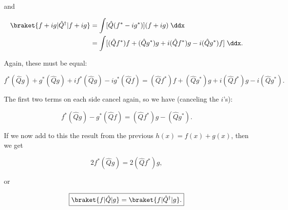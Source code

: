 and

\begin{align*}
    \braket{f+ig|\hat{Q}^{\dagger}|f+ig} &= \int[\hat{Q}(f^* - ig^*)](f + ig)\;\ddx \\
    &= \int[(\hat{Q}f^*)f + (\hat{Q}g^*)g + i(\hat{Q}f^*)g - i(\hat{Q}g^*)f]\;\ddx.
\end{align*}

Again, these must be equal:

\begin{equation*}
    f^*(\hat{Q}g) + g^*(\hat{Q}g) + if^*(\hat{Q}g) - ig^*(\hat{Q}f) = (\hat{Q}f^*)f + (\hat{Q}g^*)g + i(\hat{Q}f^*)g - i(\hat{Q}g^*).
\end{equation*}

The first two terms on each side cancel again, so we have (canceling the $i$'s):

\begin{equation*}
    f^*(\hat{Q}g) - g^*(\hat{Q}f) = (\hat{Q}f^*)g - (\hat{Q}g^*).
\end{equation*}

If we now add to this the result from the previous $h(x) = f(x) + g(x)$, then we get

\begin{equation}
    2f^*(\hat{Q}g) = 2(\hat{Q}f^*)g,
\end{equation}

or

\begin{equation*}
    \boxed{\braket{f|\hat{Q}|g} = \braket{f|\hat{Q}^{\dagger}|g}.}
\end{equation*}
